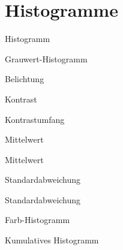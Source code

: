 \section{Histogramme}

\begin{defi}{Histogramm}

\end{defi}

\begin{defi}{Grauwert-Histogramm}

\end{defi}

\begin{defi}{Belichtung}

\end{defi}

\begin{defi}{Kontrast}

\end{defi}

\begin{defi}{Kontrastumfang}

\end{defi}

\begin{defi}[Histogramm]{Mittelwert}

\end{defi}

\begin{example}[Histogramm]{Mittelwert}

\end{example}

\begin{defi}[Histogramm]{Standardabweichung}

\end{defi}

\begin{example}[Histogramm]{Standardabweichung}

\end{example}

\begin{defi}{Farb-Histogramm}

\end{defi}

\begin{defi}{Kumulatives Histogramm}

\end{defi}


